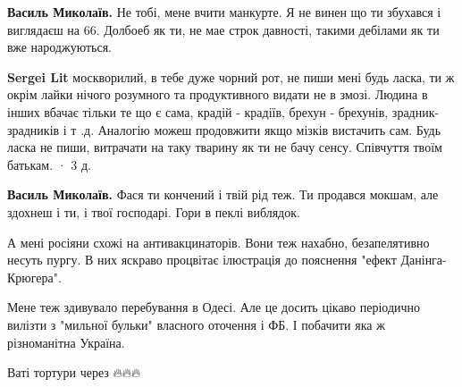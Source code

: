 \begin{itemize}
\begin{itemize}
 
\textbf{Василь Миколаїв.} Не тобі, мене вчити манкурте. Я не винен що ти збухався і виглядаєш на 66. Долбоеб як ти, не мае строк давності, такими дебілами як ти вже народжуються.

 
\textbf{Sergei Lit} москворилий, в тебе дуже чорний рот, не пиши мені будь
ласка, ти ж окрім лайки нічого розумного та продуктивного видати не в змозі.
Людина в інших вбачає тільки те що є сама, крадій - крадіїв, брехун - брехунів,
зрадник- зрадників і т .д. Аналогію можеш продовжити якщо мізків вистачить сам.
Будь ласка не пиши, витрачати на таку тварину як ти не бачу сенсу. Співчуття
твоїм батькам.  
· 3 д.
 
\textbf{Василь Миколаїв.} Фася ти кончений і твій рід теж. Ти продався мокшам,
але здохнеш і ти, і твої господарі. Гори в пеклі виблядок.

\end{itemize}


 

А мені росіяни схожі на антивакцинаторів. Вони теж нахабно, безапелятивно
несуть пургу. В них яскраво процвітає ілюстрація до пояснення "ефект
Данінга-Крюгера".

Мене теж здивувало перебування в Одесі. Але це досить цікаво періодично вилізти
з "мильної бульки" власного оточення і ФБ. І побачити яка ж різноманітна
Україна.

Ваті тортури через 🔥🔥🔥


 

\end{itemize}
